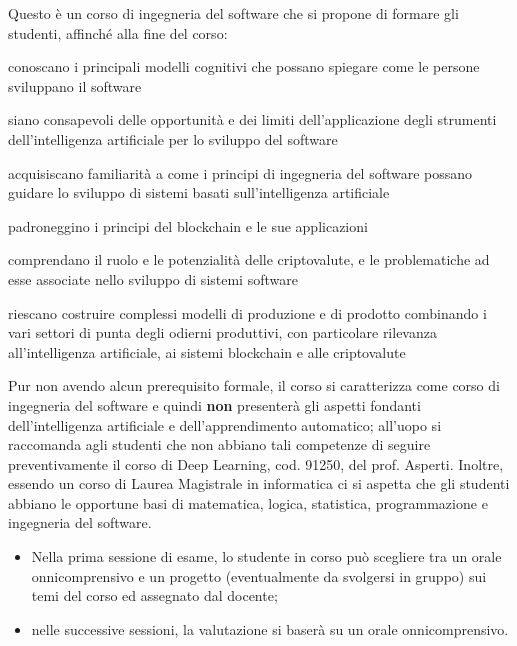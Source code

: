 \documentclass[11pt, a4paper]{article}
\begin{document}
\noindent
Questo è un corso di ingegneria del software che si propone di formare gli studenti, affinché alla fine del corso:
\begin{borderedsquare}
     \setlength\itemsep{0.3em}        
\item conoscano i principali modelli cognitivi che possano spiegare come le persone sviluppano il software
\item siano consapevoli delle opportunità e dei limiti dell’applicazione degli strumenti dell’intelligenza artificiale per lo sviluppo del software
\item acquisiscano familiarità a come i principi di ingegneria del software possano guidare lo sviluppo di sistemi basati sull’intelligenza artificiale
\item padroneggino i principi del blockchain e le sue applicazioni
\item comprendano il ruolo e le potenzialità delle criptovalute, e le problematiche ad esse associate nello sviluppo di sistemi software
\item riescano costruire complessi modelli di produzione e di prodotto combinando i vari settori di punta degli odierni produttivi, con particolare rilevanza all’intelligenza artificiale, ai sistemi blockchain e alle criptovalute
\end{borderedsquare}
        

Pur non avendo alcun prerequisito formale, il corso si caratterizza come corso di ingegneria del software e quindi \textbf{non} presenterà gli aspetti fondanti dell’intelligenza artificiale e dell’apprendimento automatico; all’uopo si raccomanda agli studenti che non abbiano tali competenze di seguire preventivamente il corso di Deep Learning, cod. 91250, del prof. Asperti. Inoltre, essendo un corso di Laurea Magistrale in informatica ci si aspetta che gli studenti abbiano le opportune basi di  matematica, logica, statistica, programmazione e ingegneria del software.


\begin{itemize}
\item Nella prima sessione di esame, lo studente in corso può scegliere tra un orale onnicomprensivo e un progetto (eventualmente da svolgersi in gruppo) sui temi del corso ed assegnato dal docente;
\item nelle successive sessioni, la valutazione si baserà su un orale onnicomprensivo.
\end{itemize}
\end{document}
